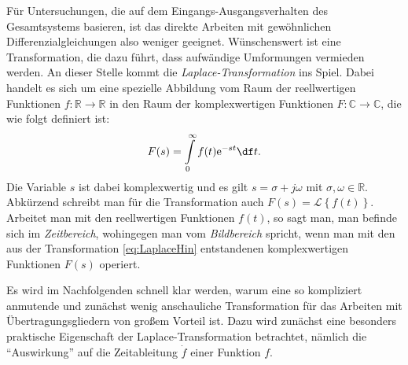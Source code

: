 Für Untersuchungen, die auf dem Eingangs-Ausgangsverhalten des Gesamtsystems basieren, ist das direkte Arbeiten mit gewöhnlichen Differenzialgleichungen also weniger geeignet. Wünschenswert ist eine Transformation, die dazu führt, dass aufwändige Umformungen vermieden werden.
An dieser Stelle kommt die \emph{Laplace-Transformation} ins Spiel. Dabei handelt es sich um eine spezielle Abbildung vom Raum der reellwertigen Funktionen $f : \mathbb{R} \to \mathbb{R}$ in den Raum der komplexwertigen Funktionen $F : \mathbb{C} \to \mathbb{C}$, die wie folgt definiert ist:
\begin{equation} \label{eq:LaplaceHin}
  F(s) = \int\limits_0^\infty f(t)\mathrm{e}^{-st}\df t.
\end{equation}
Die Variable $s$ ist dabei komplexwertig und es gilt $s = \sigma + j \omega$ mit $\sigma, \omega \in \mathbb{R}$.
Abkürzend schreibt man für die Transformation auch $F(s) = \mathcal{L}\left\{f(t)\right\}$.
Arbeitet man mit den reellwertigen Funktionen $f(t)$, so sagt man, man befinde sich im \emph{Zeitbereich}, wohingegen man vom \emph{Bildbereich} spricht, wenn man mit den aus der Transformation \eqref{eq:LaplaceHin} entstandenen komplexwertigen Funktionen $F(s)$ operiert.

Es wird im Nachfolgenden schnell klar werden, warum eine so kompliziert anmutende und zunächst wenig anschauliche Transformation für das Arbeiten mit Übertragungsgliedern von großem Vorteil ist. Dazu wird zunächst eine besonders praktische Eigenschaft der Laplace-Transformation betrachtet, nämlich die "`Auswirkung"' auf die Zeitableitung $\dot f$ einer Funktion $f$.

